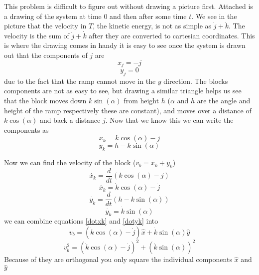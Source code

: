 \documentclass[11pt]{article}
\numberwithin{equation}{section}
\begin{document}
This problem is difficult to figure out without drawing a picture first. Attached is a drawing of the system at time $0$ and then after some time $t$. We see in the picture that the velocity in $T$, the kinetic energy, is not as simple as $\dot{j} + \dot{k}$. The velocity is the sum of $\dot{j} + \dot{k}$ after they are converted to cartesian coordinates. This is where the drawing comes in handy it is easy to see once the system is drawn out that the components of $j$ are
$$x_j = -j$$
$$y_j = 0$$
due to the fact that the ramp cannot move in the $y$ direction. The blocks components are not as easy to see, but drawing a similar triangle helps us see that the block moves down $k\sin{(\alpha)}$ from height $h$ ($\alpha$ and $h$ are the angle and height of the ramp respectively these are constant), and moves over a distance of $k\cos{(\alpha)}$ and back a distance $j$. Now that we know this we can write the components as
\begin{equation}
x_k = k\cos{(\alpha)} - j  
\label{x_k}
\end{equation}
\begin{equation}
y_k = h - k\sin{(\alpha)}
\label{y_k}
\end{equation}

Now we can find the velocity of the block ($v_b = \dot{x_k} + \dot{y_k}$)
$$\dot{x_k} = \frac{d}{dt}(k\cos{(\alpha)} - j)$$  
\begin{equation}
\dot{x_k} = \dot{k}\cos{(\alpha) - \dot{j}}  
\label{dotxk}
\end{equation}
$$\dot{y_k} = \frac{d}{dt}(h - k\sin{(\alpha)})$$
\begin{equation}
\dot{y_k} = \dot{k}\sin{(\alpha)}
\label{dotyk}
\end{equation}
we can combine equations \ref{dotxk} and \ref{dotyk} into
$$v_b =(\dot{k}\cos{(\alpha)} - \dot{j})\hat{x} + \dot{k}\sin{(\alpha)\hat{y}}$$
$$v_b^2 =(\dot{k}\cos{(\alpha)} - \dot{j})^2 + (\dot{k}\sin{(\alpha)})^2$$
Because of they are orthogonal you only square the individual components $\hat{x}$ and $\hat{y}$
\end{document}
